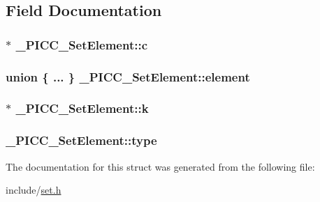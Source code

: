 \subsection{Field Documentation}
\hypertarget{struct__PICC__SetElement_a96b268d1a7db23c6c8c6d3e0ff8e5ebb}{
\subsubsection[{c}]{$\ast$ \-\_\-\-P\-I\-C\-C\-\_\-\-Set\-Element\-::c}}\label{struct__PICC__SetElement_a96b268d1a7db23c6c8c6d3e0ff8e5ebb}
\hypertarget{struct__PICC__SetElement_a3ed4936810d7358e75a062e5e17fa26e}{
\subsubsection[{element}]{\setlength{\rightskip}{0pt plus 5cm}union \{ ... \}   \-\_\-\-P\-I\-C\-C\-\_\-\-Set\-Element\-::element}}\label{struct__PICC__SetElement_a3ed4936810d7358e75a062e5e17fa26e}
\hypertarget{struct__PICC__SetElement_a5d751b689a48e4cc3db2711a1a496f24}{
\subsubsection[{k}]{$\ast$ \-\_\-\-P\-I\-C\-C\-\_\-\-Set\-Element\-::k}}\label{struct__PICC__SetElement_a5d751b689a48e4cc3db2711a1a496f24}
\hypertarget{struct__PICC__SetElement_a4fc25820ff4efe2603a2889a2b9999ef}{
\subsubsection[{type}]{ \-\_\-\-P\-I\-C\-C\-\_\-\-Set\-Element\-::type}}\label{struct__PICC__SetElement_a4fc25820ff4efe2603a2889a2b9999ef}


The documentation for this struct was generated from the following file\-:\begin{DoxyCompactItemize}
\item 
include/\hyperlink{set_8h}{set.\-h}\end{DoxyCompactItemize}
